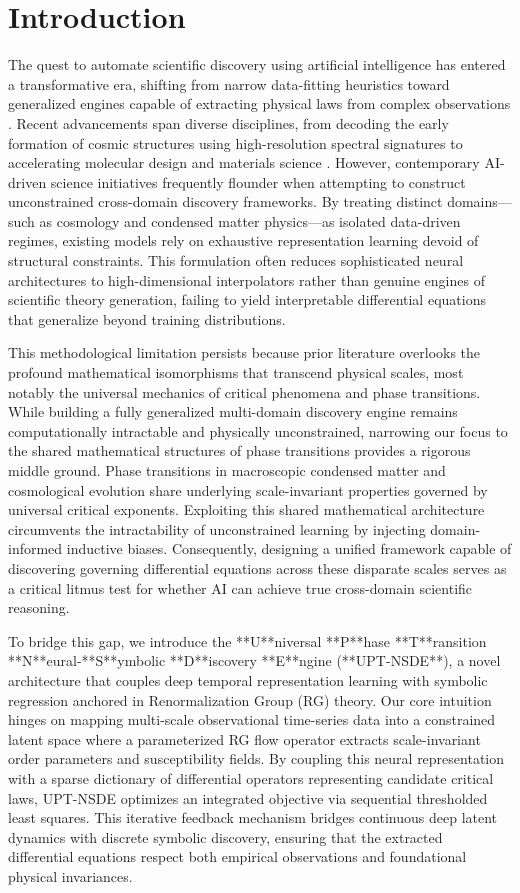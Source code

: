 \documentclass[10pt,twocolumn]{article}
\begin{document}
\section{Introduction}
The quest to automate scientific discovery using artificial intelligence has entered a transformative era, shifting from narrow data-fitting heuristics toward generalized engines capable of extracting physical laws from complex observations \cite{target_ref}. Recent advancements span diverse disciplines, from decoding the early formation of cosmic structures using high-resolution spectral signatures \cite{ref_2} to accelerating molecular design and materials science \cite{ref_4}. However, contemporary AI-driven science initiatives frequently flounder when attempting to construct unconstrained cross-domain discovery frameworks. By treating distinct domains—such as cosmology and condensed matter physics—as isolated data-driven regimes, existing models rely on exhaustive representation learning devoid of structural constraints. This formulation often reduces sophisticated neural architectures to high-dimensional interpolators rather than genuine engines of scientific theory generation, failing to yield interpretable differential equations that generalize beyond training distributions.

This methodological limitation persists because prior literature overlooks the profound mathematical isomorphisms that transcend physical scales, most notably the universal mechanics of critical phenomena and phase transitions. While building a fully generalized multi-domain discovery engine remains computationally intractable and physically unconstrained, narrowing our focus to the shared mathematical structures of phase transitions provides a rigorous middle ground. Phase transitions in macroscopic condensed matter and cosmological evolution share underlying scale-invariant properties governed by universal critical exponents. Exploiting this shared mathematical architecture circumvents the intractability of unconstrained learning by injecting domain-informed inductive biases. Consequently, designing a unified framework capable of discovering governing differential equations across these disparate scales serves as a critical litmus test for whether AI can achieve true cross-domain scientific reasoning.

To bridge this gap, we introduce the **U**niversal **P**hase **T**ransition **N**eural-**S**ymbolic **D**iscovery **E**ngine (**UPT-NSDE**), a novel architecture that couples deep temporal representation learning with symbolic regression anchored in Renormalization Group (RG) theory. Our core intuition hinges on mapping multi-scale observational time-series data into a constrained latent space where a parameterized RG flow operator extracts scale-invariant order parameters and susceptibility fields. By coupling this neural representation with a sparse dictionary of differential operators representing candidate critical laws, UPT-NSDE optimizes an integrated objective via sequential thresholded least squares. This iterative feedback mechanism bridges continuous deep latent dynamics with discrete symbolic discovery, ensuring that the extracted differential equations respect both empirical observations and foundational physical invariances.
\end{document}
